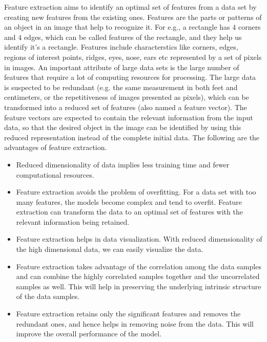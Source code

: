 Feature extraction aims to identify an optimal set of features from a data set by creating new features from the existing ones. Features are the parts or patterns of an object in an image that help to recognize it. For e.g., a rectangle has $4$ corners and $4$ edges, which can be called features of the rectangle, and they help us identify it’s a rectangle. Features include characterstics like corners, edges, regions of interest points, ridges, eyes, nose, ears etc represented by a set of pixels in images. An important attribute of large data sets is the large number of features that require a lot of computing resources for processing. The large data is suspected to be redundant (e.g. the same measurement in both feet and centimeters, or the repetitiveness of images presented as pixels), which can be transformed into a reduced set of features (also named a feature vector). %
The feature vectors are expected to contain the relevant information from the input data, so that the desired object in the image can be identified by using this reduced representation instead of the complete initial data.
The following are the advantages of feature extraction.
%
\begin{itemize}
    \item Reduced dimensionality of data implies less training time and fewer computational resources.  
    \item Feature extraction avoids the problem of overfitting. For a data set with too many features, the models become complex and tend to overfit. Feature extraction can transform the data to an optimal set of features with the relevant information being retained. 
    \item Feature extraction helps in data visualization. With reduced dimensionality of the high dimensional data, we can easily visualize the data.
    \item Feature extraction takes advantage of the correlation among the data samples and can combine the highly correlated samples together and the uncorrelated samples as well. This will help in preserving the underlying intrinsic structure of the data samples.
    \item Feature extraction retains only the significant features and removes the redundant ones, and hence helps in removing noise from the data. This will improve the overall performance of the model.
\end{itemize}
